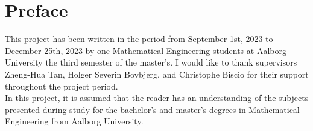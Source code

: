 \chapter*{Preface}
This project has been written in the period from September 1st, 2023 to December 25th, 2023 by one Mathematical Engineering students at Aalborg University the third semester of the master's. I would like to thank supervisors Zheng-Hua Tan, Holger Severin Bovbjerg, and Christophe Biscio for their support throughout the project period. 
\\
In this project, it is assumed that the reader has an understanding of the subjects presented during study for the bachelor's and master's degrees in Mathematical Engineering from Aalborg University.\\ \\
